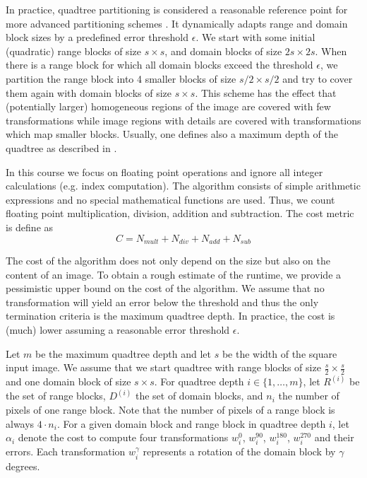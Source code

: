  In practice, quadtree partitioning is considered
a reasonable reference point for more advanced partitioning schemes
\cite{fisher2012}. It dynamically adapts range and domain block sizes by a
predefined error threshold $\epsilon$. We start with some initial (quadratic)
range blocks of size $s \times s$, and domain blocks of size $2s \times 2s$.
When there is a range block for which all domain blocks exceed the threshold
$\epsilon$, we partition the range block into 4 smaller blocks of size
$s/2 \times s/2$ and try to cover them again with domain blocks of size
$s \times s$. This scheme has the effect that (potentially larger) homogeneous
regions of the image are covered with few transformations while image regions
with details are covered with transformations which map smaller blocks. Usually,
one defines also a maximum depth of the quadtree as described in
\cite{fisher2012}.

 In this course we focus on floating point operations and ignore all
integer calculations (e.g. index computation). The algorithm consists of simple arithmetic
expressions and no special mathematical functions are used. Thus, we count floating point
multiplication, division, addition and subtraction. The cost metric is define as
\begin{equation} \label{eq:cost}
C = N_{mult} + N_{div} + N_{add} + N_{sub}
\end{equation}

The cost of the algorithm does not only depend on the size but also on the content
of an image. To obtain a rough estimate of the runtime, we provide a
pessimistic upper bound on the cost of the algorithm. We assume that no transformation
will yield an error below the threshold and thus the only termination criteria is the
maximum quadtree depth. In practice, the cost is (much) lower assuming a reasonable
error threshold $\epsilon$.

Let $m$ be the maximum quadtree depth and let $s$ be the width of the square
input image. We assume that we start quadtree with range blocks of size
$\frac{s}{2}\times\frac{s}{2}$ and one domain block of size $s \times s$. For
quadtree depth $i \in \{1, \dots, m\}$, let $R^{(i)}$ be the set of range
blocks, $D^{(i)}$ the set of domain blocks, and $n_{i}$ the number of pixels of
one range block. Note that the number of pixels of a range block is always
$4\cdot n_{i}$. For a given domain block and range block in quadtree depth $i$,
let $\alpha_{i}$ denote the cost to compute four transformations $w_i^{0}$,
$w_i^{90}$, $w_i^{180}$, $w_i^{270}$ and their errors. Each transformation
$w_i^{\gamma}$ represents a rotation of the domain block by $\gamma$ degrees.

